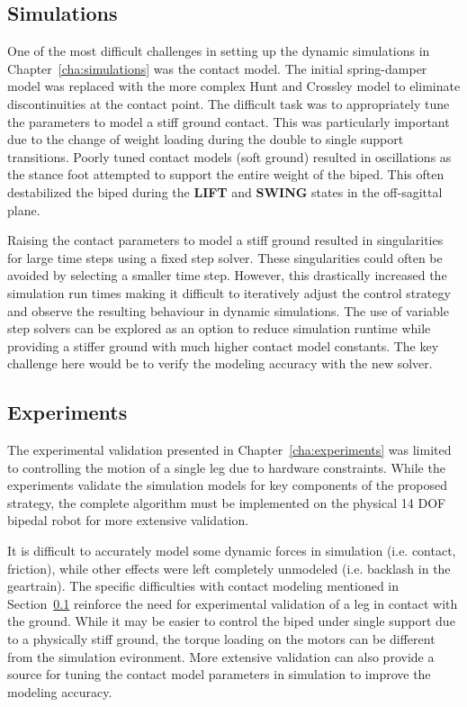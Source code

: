 \subsection{Simulations} %
\label{sub:simulations}
One of the most difficult challenges in setting up the dynamic simulations in Chapter~\ref{cha:simulations} was the contact model. The initial spring-damper model was replaced with the more complex Hunt and Crossley model to eliminate discontinuities at the contact point. The difficult task was to appropriately tune the parameters to model a stiff ground contact. This was particularly important due to the change of weight loading during the double to single support transitions. Poorly tuned contact models (soft ground) resulted in oscillations as the stance foot attempted to support the entire weight of the biped. This often destabilized the biped during the \textbf{LIFT} and \textbf{SWING} states in the off-sagittal plane. 

Raising the contact parameters to model a stiff ground resulted in singularities for large time steps using a fixed step solver. These singularities could often be avoided by selecting a smaller time step. However, this drastically increased the simulation run times making it difficult to iteratively adjust the control strategy and observe the resulting behaviour in dynamic simulations. The use of variable step solvers can be explored as an option to reduce simulation runtime while providing a stiffer ground with much higher contact model constants. The key challenge here would be to verify the modeling accuracy with the new solver. 

\subsection{Experiments} %
\label{sub:experiments}
The experimental validation presented in Chapter~\ref{cha:experiments} was limited to controlling the motion of a single leg due to hardware constraints. While the experiments validate the simulation models for key components of the proposed strategy, the complete algorithm must be implemented on the physical 14 DOF bipedal robot for more extensive validation. 

It is difficult to accurately model some dynamic forces in simulation (i.e. contact, friction), while other effects were left completely unmodeled (i.e. backlash in the geartrain). The specific difficulties with contact modeling mentioned in Section~\ref{sub:simulations} reinforce the need for experimental validation of a leg in contact with the ground. While it may be easier to control the biped under single support due to a physically stiff ground, the torque loading on the motors can be different from the simulation evironment. More extensive validation can also provide a source for tuning the contact model parameters in simulation to improve the modeling accuracy. 

